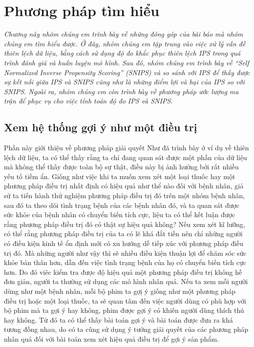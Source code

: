 \chapter{Phương pháp tìm hiểu}
\label{Chapter3}

\noindent\textit{Chương này nhóm chúng em trình bày về những đóng góp của bài báo mà nhóm chúng em tìm hiểu được. Ở đây, nhóm chúng em tập trung vào việc xử lý vấn đề thiên lệch dữ liệu, bằng cách sử dụng độ đo khắc phục thiên lệch IPS trong quá trình đánh giá và huấn luyện mô hình. Sau đó, nhóm chúng em trình bày về ``Self Normalized Inverse Propensity Scoring'' (SNIPS) và so sánh với IPS để thấy được sự kết nối giữa IPS và SNIPS cũng như là những điểm lợi và hại của IPS so với SNIPS. Ngoài ra, nhóm chúng em còn trình bày về phương pháp ước lượng ma trận để phục vụ cho việc tính toán độ đo IPS và SNIPS.}

\section{Xem hệ thống gợi ý như một điều trị}
Phần này giới thiệu về phương pháp giải quyết 
Như đã trình bày ở ví dụ về thiên lệch dữ liệu, ta có thể thấy rằng ta chỉ đang quan sát được một phần của dữ liệu mà không thể thấy được toàn bộ sự thật, điều này bị ảnh hưởng bởi rất nhiều yếu tố tiềm ẩn. Giống như việc khi ta muốn xem xét một loại thuốc hay một phương pháp điều trị nhất định có hiệu quả như thể nào đối với bệnh nhân,  giả sử ta tiến hành thử nghiệm phương pháp điều trị đó trên một nhóm bệnh nhân, sau đó ta theo dõi tình trạng bệnh của các bệnh nhân đó, và ta quan sát được sức khỏe của bệnh nhân có chuyển biến tích cực, liệu ta có thể kết luận được rằng phương pháp điều trị đó có thật sự hiệu quả không? Nếu xem xét kĩ lưỡng, có thể rằng phương pháp điều trị của ta có lẽ  khá đắt tiền nên chỉ những người có điều kiện kinh tế ổn định mới có xu hướng dễ tiếp xúc với phương pháp điều trị đó. Mà những người như vậy thì sẽ nhiều điều kiện thuận lợi để chăm sóc sức khỏe bản thân hơn, dẫn đến việc tình trạng bệnh của họ có chuyển biến tích cực hơn. Do đó viêc kiểm tra được độ hiệu quả một phương pháp điều trị không hề đơn giản, người ta thường sử dụng các mô hình nhân quả. Nếu ta xem mỗi người dùng như một bệnh nhân, mỗi bộ phim ta gợị ý giống như một phương pháp điều trị hoặc một loại thuốc, ta sẽ quan tâm đến việc người dùng có phù hợp với bộ phim mà ta gợi ý hay không, phim được gợi ý có khiến người dùng thích thú hay không. Từ đó ta có thể thấy bài toán gợi ý và bài toán được đưa ra khá tương đồng nhau, do có ta cũng sử dụng ý tưởng giải quyết của các phương pháp nhân quả đối với bài toán xem xét hiệu quả điều trị để gợi ý sản phẩm. 

